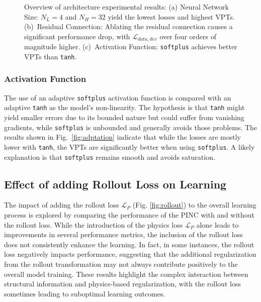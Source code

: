 


\begin{figure}[H]
    \caption{Overview of architecture experimental results: (a) Neural Network Size: $N_L = 4$ and $N_H = 32$ yield the lowest losses and highest VPTs. (b)~Residual Connection: Ablating the residual connection causes a significant performance drop, with $\mathcal{L}_{data,dev}$ over four orders of magnitude higher. (c)~Activation Function: \lstinline|softplus| achieves better VPTs than \lstinline|tanh|.}
    \label{fig:architecture}
\end{figure}


%
\subsubsection{Activation Function}
The use of an adaptive \lstinline|softplus| activation function is compared with an adaptive \lstinline|tanh| as the model's non-linearity. The hypothesis is that \lstinline|tanh| might yield smaller errors due to its bounded nature but could suffer from vanishing gradients, while \lstinline|softplus| is unbounded and generally avoids those problems.
%
The results shown in Fig.~\ref{fig:adptation} indicate that while the losses are mostly lower with \lstinline|tanh|, the VPTs are significantly better when using \lstinline|softplus|. A likely explanation is that \lstinline|softplus| remains smooth and avoids saturation. 



\subsection{Effect of adding Rollout Loss on Learning}
The impact of adding the rollout loss $\mathcal{L}_P$ (Fig. \ref{fig:rollout}) to the overall learning process is explored by comparing the performance of the PINC with and without the rollout loss. While the introduction of the physics loss $\mathcal{L}_P$ alone leads to improvements in several performance metrics, the inclusion of the rollout loss does not consistently enhance the learning. In fact, in some instances, the rollout loss negatively impacts performance, suggesting that the additional regularization from the rollout transformation may not always contribute positively to the overall model training. These results highlight the complex interaction between structural information and physics-based regularization, with the rollout loss sometimes leading to suboptimal learning outcomes.

